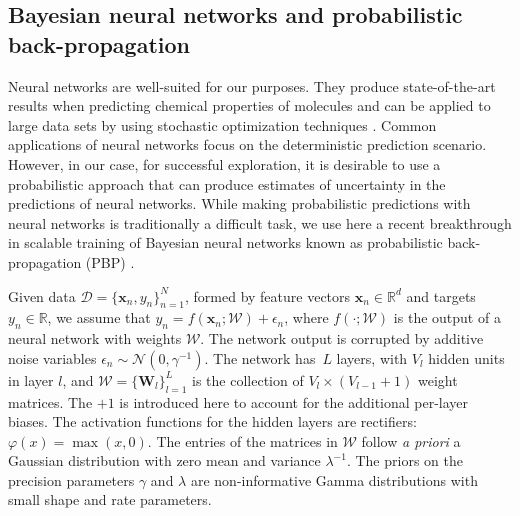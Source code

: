 \subsection{Bayesian neural networks and probabilistic back-propagation}

Neural networks are well-suited for our purposes. They produce state-of-the-art results when predicting chemical properties of molecules \cite{Ma_2015,Mayr_2016,ramsundar2015massively} and can be applied to large data sets by using stochastic optimization techniques \cite{bousquet2008tradeoffs}. Common applications of neural networks focus on the deterministic prediction scenario. However, in our case, for successful exploration, it is desirable to use a probabilistic approach that can produce estimates of uncertainty in the predictions of neural networks. While making probabilistic predictions with neural networks is traditionally a difficult task, we use here a recent breakthrough in scalable training of Bayesian neural networks known as probabilistic back-propagation (PBP) \cite{hernandez2015probabilistic}. 

Given data ${\mathcal{D} = \{\mathbf{x}_n, y_n \}_{n=1}^N}$, formed by feature vectors $\mathbf{x}_n \in \mathbb{R}^d$ and targets ${y_n \in \mathbb{R}}$, we assume that $y_n = f(\mathbf{x}_n;\mathcal{W}) + \epsilon_n$, where $f(\cdot ;\mathcal{W})$ is the output of a neural network with weights $\mathcal{W}$. The network output is corrupted by additive noise variables $\epsilon_n \sim \mathcal{N}(0,\gamma^{-1})$. The network has~$L$ layers, with $V_l$ hidden units in layer $l$, and $\mathcal{W} = \{ \mathbf{W}_l \}_{l=1}^L$ is the collection of $V_l \times (V_{l-1}+1)$ weight matrices. The $+1$ is introduced here to account for the additional per-layer biases. The activation functions for the hidden layers are rectifiers: $\varphi(x) = \max(x,0)$. The entries of the matrices in $\mathcal{W}$ follow \emph{a priori} a Gaussian distribution with zero mean and variance $\lambda^{-1}$. The priors on the precision parameters $\gamma$ and $\lambda$ are non-informative Gamma distributions with small shape and rate parameters.

